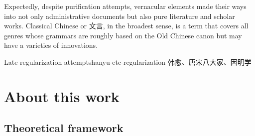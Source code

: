 \documentclass[UTF8, a4paper, oneside, scheme=plain, 12pt]{ctexrep}
\begin{document}
Expectedly, despite purification attempts,
vernacular elements made their ways into not only administrative documents
but also pure literature and scholar works.
Classical Chinese or 文言, in the broadest sense,
is a term that covers all genres whose grammars are roughly based on the Old Chinese canon
but may have a varieties of innovations.

\begin{todobox}{Late regularization attempts}{hanyu-etc-regularization}
    韩愈、唐宋八大家、因明学
\end{todobox}

\section{About this work}

\subsection{Theoretical framework}\label{sec:intro.theory}
\end{document}
